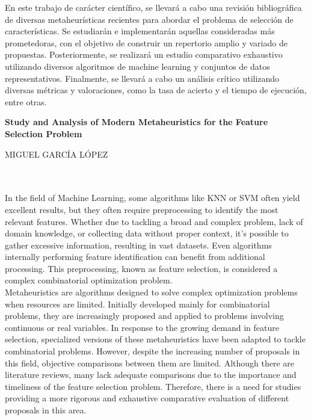 En este trabajo de carácter científico, se llevará a cabo una revisión bibliográfica de diversas metaheurísticas recientes para abordar el problema de selección de características. Se estudiarán e implementarán aquellas consideradas más prometedoras, con el objetivo de construir un repertorio amplio y variado de propuestas. Posteriormente, se realizará un estudio comparativo exhaustivo utilizando diversos algoritmos de machine learning y conjuntos de datos representativos. Finalmente, se llevará a cabo un análisis crítico utilizando diversas métricas y valoraciones, como la tasa de acierto y el tiempo de ejecución, entre otras.
\cleardoublepage


\thispagestyle{empty}


\begin{center}
{\large\bfseries Study and Analysis of Modern Metaheuristics for the Feature Selection Problem}\\
\end{center}
\begin{center}
MIGUEL GARCÍA LÓPEZ\\
\end{center}

\\

\vspace{0.7cm}
\\

In the field of Machine Learning, some algorithms like KNN or SVM often yield excellent results, but they often require preprocessing to identify the most relevant features. Whether due to tackling a broad and complex problem, lack of domain knowledge, or collecting data without proper context, it's possible to gather excessive information, resulting in vast datasets. Even algorithms internally performing feature identification can benefit from additional processing. This preprocessing, known as feature selection, is considered a complex combinatorial optimization problem.\\[6pt]

Metaheuristics are algorithms designed to solve complex optimization problems when resources are limited. Initially developed mainly for combinatorial problems, they are increasingly proposed and applied to problems involving continuous or real variables. In response to the growing demand in feature selection, specialized versions of these metaheuristics have been adapted to tackle combinatorial problems. However, despite the increasing number of proposals in this field, objective comparisons between them are limited. Although there are literature reviews, many lack adequate comparisons due to the importance and timeliness of the feature selection problem. Therefore, there is a need for studies providing a more rigorous and exhaustive comparative evaluation of different proposals in this area.\\[6pt]

